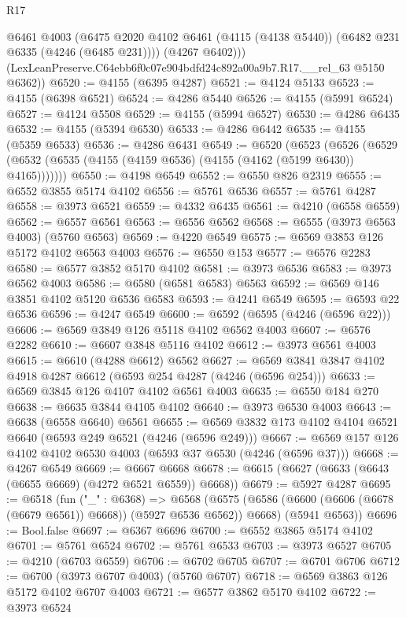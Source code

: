 \begin{lexlean}{R17}
\begin{coremodule}
          @6461
          @4003
          (@6475 @2020 @4102 @6461 (@4115 (@4138 @5440)) (@6482 @231 @6335 (@4246 (@6485 @231))))
          (@4267 @6402)))
      (LexLeanPreserve.C64ebb6f0c07e904bdfd24c892a00a9b7.R17.__rel_63 @5150 @6362))
@6520 := @4155 (@6395 @4287)
@6521 := @4124 @5133
@6523 := @4155 (@6398 @6521)
@6524 := @4286 @5440
@6526 := @4155 (@5991 @6524)
@6527 := @4124 @5508
@6529 := @4155 (@5994 @6527)
@6530 := @4286 @6435
@6532 := @4155 (@5394 @6530)
@6533 := @4286 @6442
@6535 := @4155 (@5359 @6533)
@6536 := @4286 @6431
@6549 := @6520
    (@6523
      (@6526 (@6529 (@6532 (@6535 (@4155 (@4159 @6536) (@4155 (@4162 (@5199 @6430)) @4165)))))))
@6550 := @4198 @6549
@6552 := @6550 @826 @2319
@6555 := @6552 @3855 @5174 @4102
@6556 := @5761 @6536
@6557 := @5761 @4287
@6558 := @3973 @6521
@6559 := @4332 @6435
@6561 := @4210 (@6558 @6559)
@6562 := @6557 @6561
@6563 := @6556 @6562
@6568 := @6555 (@3973 @6563 @4003) (@5760 @6563)
@6569 := @4220 @6549
@6575 := @6569 @3853 @126 @5172 @4102 @6563 @4003
@6576 := @6550 @153
@6577 := @6576 @2283
@6580 := @6577 @3852 @5170 @4102
@6581 := @3973 @6536
@6583 := @3973 @6562 @4003
@6586 := @6580 (@6581 @6583) @6563
@6592 := @6569 @146 @3851 @4102 @5120 @6536 @6583
@6593 := @4241 @6549
@6595 := @6593 @22 @6536
@6596 := @4247 @6549
@6600 := @6592 (@6595 (@4246 (@6596 @22)))
@6606 := @6569 @3849 @126 @5118 @4102 @6562 @4003
@6607 := @6576 @2282
@6610 := @6607 @3848 @5116 @4102
@6612 := @3973 @6561 @4003
@6615 := @6610 (@4288 @6612) @6562
@6627 := @6569 @3841 @3847 @4102 @4918 @4287 @6612 (@6593 @254 @4287 (@4246 (@6596 @254)))
@6633 := @6569 @3845 @126 @4107 @4102 @6561 @4003
@6635 := @6550 @184 @270
@6638 := @6635 @3844 @4105 @4102
@6640 := @3973 @6530 @4003
@6643 := @6638 (@6558 @6640) @6561
@6655 := @6569 @3832 @173 @4102 @4104 @6521 @6640 (@6593 @249 @6521 (@4246 (@6596 @249)))
@6667 := @6569 @157 @126 @4102 @4102 @6530 @4003 (@6593 @37 @6530 (@4246 (@6596 @37)))
@6668 := @4267 @6549
@6669 := @6667 @6668
@6678 := @6615 (@6627 (@6633 (@6643 (@6655 @6669) (@4272 @6521 @6559)) @6668))
@6679 := @5927 @4287
@6695 := @6518
    (fun ("_" : @6368) =>
    @6568
      (@6575 (@6586 (@6600 (@6606 (@6678 (@6679 @6561)) @6668)) (@5927 @6536 @6562)) @6668)
      (@5941 @6563))
@6696 := Bool.false
@6697 := @6367 @6696
@6700 := @6552 @3865 @5174 @4102
@6701 := @5761 @6524
@6702 := @5761 @6533
@6703 := @3973 @6527
@6705 := @4210 (@6703 @6559)
@6706 := @6702 @6705
@6707 := @6701 @6706
@6712 := @6700 (@3973 @6707 @4003) (@5760 @6707)
@6718 := @6569 @3863 @126 @5172 @4102 @6707 @4003
@6721 := @6577 @3862 @5170 @4102
@6722 := @3973 @6524

\end{coremodule}
\end{lexlean}
